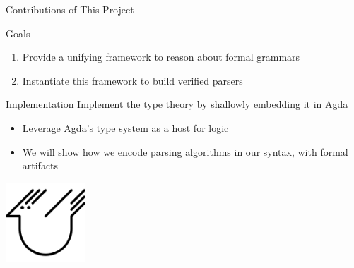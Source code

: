 \documentclass[10pt]{beamer}
\begin{document}
\begin{frame}{Contributions of This Project}
  \begin{alertblock}{Goals}
    \begin{enumerate}
       \item<1-> Provide a unifying framework to reason about formal grammars
       \item<2-> Instantiate this framework to build verified parsers
    \end{enumerate}
  \end{alertblock}


\end{frame}

\begin{frame}{Implementation}
  Implement the type theory by shallowly embedding it in Agda
  \begin{itemize}
    \item Leverage Agda's type system as a host for logic
    \item We will show how we encode parsing algorithms in our syntax, with formal artifacts
  \end{itemize}
  \begin{center}
  \includegraphics[width=3cm]{figures/agda.png}
  \end{center}
\end{frame}
\end{document}
